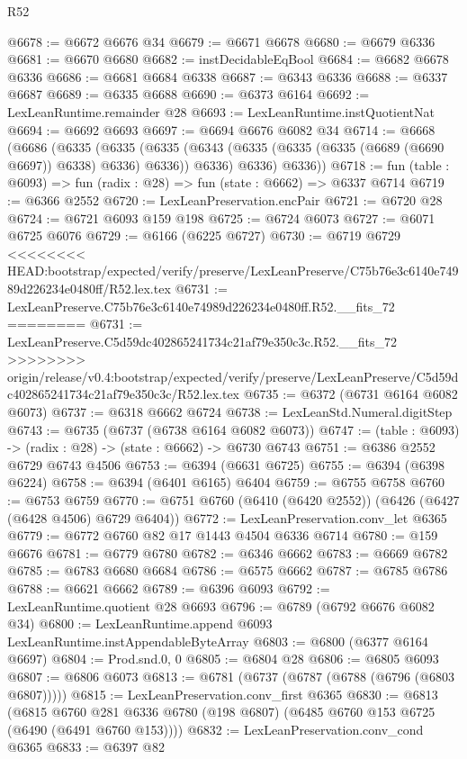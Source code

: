 \begin{lexlean}{R52}
\begin{coremodule}
{{{{{{{{{{{{{{{{{{{{{{{{{{{{{{{{{{{{{{{{{{{{{{{{{{{{{{{{{{{{{{{{{{{{{{{{{{{{{{{{{{{{{{{{{{{{{{{{{{{{{{{{{{{{{{{{{{{{{{{{{{{{{{{{{{{{{{{{{{{{{{{{{{{{{{{{{{{{{{{{{{{{{{{{{{{{{{{{{{{{{{{{{{{{{{{{{{{{{{@6678 := @6672 @6676 @34
@6679 := @6671 @6678
@6680 := @6679 @6336
@6681 := @6670 @6680
@6682 := instDecidableEqBool
@6684 := @6682 @6678 @6336
@6686 := @6681 @6684 @6338
@6687 := @6343 @6336
@6688 := @6337 @6687
@6689 := @6335 @6688
@6690 := @6373 @6164
@6692 := LexLeanRuntime.remainder @28
@6693 := LexLeanRuntime.instQuotientNat
@6694 := @6692 @6693
@6697 := @6694 @6676 @6082 @34
@6714 := @6668
    (@6686
      (@6335
        (@6335
          (@6335 (@6343 (@6335 (@6335 (@6335 (@6689 (@6690 @6697)) @6338) @6336) @6336)) @6336)
          @6336)
        @6336))
@6718 := fun (table : @6093) => fun (radix : @28) => fun (state : @6662) => @6337 @6714
@6719 := @6366 @2552
@6720 := LexLeanPreservation.encPair
@6721 := @6720 @28
@6724 := @6721 @6093 @159 @198
@6725 := @6724 @6073
@6727 := @6071 @6725 @6076
@6729 := @6166 (@6225 @6727)
@6730 := @6719 @6729
<<<<<<<< HEAD:bootstrap/expected/verify/preserve/LexLeanPreserve/C75b76e3c6140e74989d226234e0480ff/R52.lex.tex
@6731 := LexLeanPreserve.C75b76e3c6140e74989d226234e0480ff.R52.__fits_72
========
@6731 := LexLeanPreserve.C5d59dc402865241734c21af79e350c3c.R52.__fits_72
>>>>>>>> origin/release/v0.4:bootstrap/expected/verify/preserve/LexLeanPreserve/C5d59dc402865241734c21af79e350c3c/R52.lex.tex
@6735 := @6372 (@6731 @6164 @6082 @6073)
@6737 := @6318 @6662 @6724
@6738 := LexLeanStd.Numeral.digitStep
@6743 := @6735 (@6737 (@6738 @6164 @6082 @6073))
@6747 := (table : @6093) -> (radix : @28) -> (state : @6662) -> @6730 @6743
@6751 := @6386 @2552 @6729 @6743 @4506
@6753 := @6394 (@6631 @6725)
@6755 := @6394 (@6398 @6224)
@6758 := @6394 (@6401 @6165) @6404
@6759 := @6755 @6758
@6760 := @6753 @6759
@6770 := @6751 @6760 (@6410 (@6420 @2552)) (@6426 (@6427 (@6428 @4506) @6729 @6404))
@6772 := LexLeanPreservation.conv_let @6365
@6779 := @6772 @6760 @82 @17 @1443 @4504 @6336 @6714
@6780 := @159 @6676
@6781 := @6779 @6780
@6782 := @6346 @6662
@6783 := @6669 @6782
@6785 := @6783 @6680 @6684
@6786 := @6575 @6662
@6787 := @6785 @6786
@6788 := @6621 @6662
@6789 := @6396 @6093
@6792 := LexLeanRuntime.quotient @28 @6693
@6796 := @6789 (@6792 @6676 @6082 @34)
@6800 := LexLeanRuntime.append @6093 LexLeanRuntime.instAppendableByteArray
@6803 := @6800 (@6377 @6164 @6697)
@6804 := Prod.snd.{0, 0}
@6805 := @6804 @28
@6806 := @6805 @6093
@6807 := @6806 @6073
@6813 := @6781 (@6737 (@6787 (@6788 (@6796 (@6803 @6807)))))
@6815 := LexLeanPreservation.conv_first @6365
@6830 := @6813
    (@6815 @6760 @281 @6336 @6780 (@198 @6807) (@6485 @6760 @153 @6725 (@6490 (@6491 @6760 @153))))
@6832 := LexLeanPreservation.conv_cond @6365
@6833 := @6397 @82
}}}}}}}}}}}}}}}}}}}}}}}}}}}}}}}}}}}}}}}}}}}}}}}}}}}}}}}}}}}}}}}}}}}}}}}}}}}}}}}}}}}}}}}}}}}}}}}}}}}}}}}}}}}}}}}}}}}}}}}}}}}}}}}}}}}}}}}}}}}}}}}}}}}}}}}}}}}}}}}}}}}}}}}}}}}}}}}}}}}}}}}}}}}}}}}}}}}}}}
\end{coremodule}
\end{lexlean}
